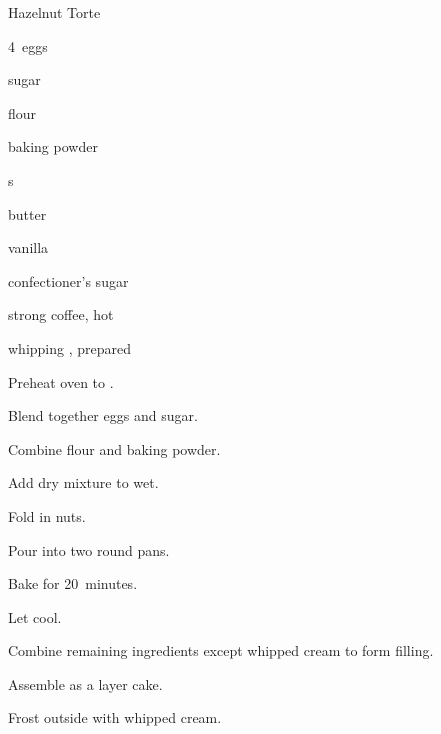 \begin{recipe}{Hazelnut Torte}{}{}

\begin{ingredients}
\item 4~eggs
\item \C{\threequarter} sugar
\item {} flour
\item \Tp{2\half} baking powder
\item {} s
\item {} butter
\item {} 
\item {} vanilla
\item {} confectioner's sugar
\item {} strong coffee, hot
\item whipping , prepared
\end{ingredients}

\begin{directions}
\item Preheat oven to .
\item Blend together eggs and sugar.
\item Combine flour and baking powder.
\item Add dry mixture to wet.
\item Fold in nuts.
\item Pour into two  round pans.
\item Bake for 20~minutes.
\item Let cool.
\item Combine remaining ingredients except whipped cream to form filling.
\item Assemble as a layer cake.
\item Frost outside with whipped cream.
\end{directions}

\end{recipe}

